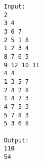 \begin{verbatim}
Input:
2
3 4
3 6 7
2 5 1 8
1 2 3 4
8 7 6 5
9 12 10 11
4 4
1 3 5 7
2 4 2 8
1 4 7 3
4 7 5 3
5 7 8 3
5 3 6 8

Output:
110
54
\end{verbatim}
